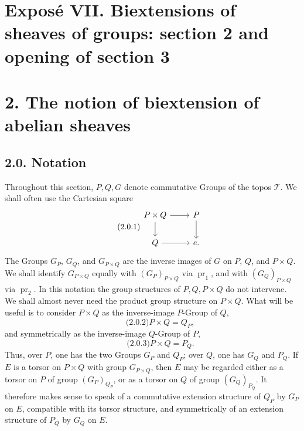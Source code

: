 \documentclass[11pt]{article}
\providecommand{\pr}{\operatorname{pr}}
\providecommand{\id}{\operatorname{id}}
\begin{document}
\providecommand{\BIEXT}{\operatorname{BIEXT}}
\providecommand{\Biext}{\operatorname{Biext}}
\providecommand{\GRAB}{\operatorname{GRAB}}
\providecommand{\TORSBIRIG}{\operatorname{TORSBIRIG}}
\providecommand{\Corr}{\operatorname{Corr}}
\providecommand{\sym}{\mathrm{sym}}
\providecommand{\id}{\mathrm{id}}
\providecommand{\cY}{\mathcal Y}
\providecommand{\cC}{\mathcal C}
\providecommand{\e}{\mathrm e}

\section*{Exposé VII. Biextensions of sheaves of groups: section 2 and opening of section 3}

\section*{2. The notion of biextension of abelian sheaves}

\subsection*{2.0. Notation}
Throughout this section, \(P,Q,G\) denote commutative Groups of the topos \(\mathcal T\).  We shall often use the Cartesian square
\begin{equation}\qquad\text{(2.0.1)}
\begin{tikzcd}
P\times Q \arrow[r] \arrow[d] & P\arrow[d]\\
Q\arrow[r] & e .
\end{tikzcd}
\end{equation}
The Groups \(G_P\), \(G_Q\), and \(G_{P\times Q}\) are the inverse images of \(G\) on \(P\), \(Q\), and \(P\times Q\).  We shall identify \(G_{P\times Q}\) equally with \((G_P)_{P\times Q}\) via \(\pr_1\), and with \((G_Q)_{P\times Q}\) via \(\pr_2\).  In this notation the group structures of \(P,Q,P\times Q\) do not intervene.  We shall almost never need the product group structure on \(P\times Q\).  What will be useful is to consider \(P\times Q\) as the inverse-image \(P\)-Group of \(Q\),
\begin{equation}\qquad\text{(2.0.2)}
  P\times Q=Q_P,
\end{equation}
and symmetrically as the inverse-image \(Q\)-Group of \(P\),
\begin{equation}\qquad\text{(2.0.3)}
  P\times Q=P_Q.
\end{equation}
Thus, over \(P\), one has the two Groups \(G_P\) and \(Q_P\); over \(Q\), one has \(G_Q\) and \(P_Q\).  If \(E\) is a torsor on \(P\times Q\) with group \(G_{P\times Q}\), then \(E\) may be regarded either as a torsor on \(P\) of group \((G_P)_{Q_P}\), or as a torsor on \(Q\) of group \((G_Q)_{P_Q}\).  It therefore makes sense to speak of a commutative extension structure of \(Q_P\) by \(G_P\) on \(E\), compatible with its torsor structure, and symmetrically of an extension structure of \(P_Q\) by \(G_Q\) on \(E\).
\end{document}
